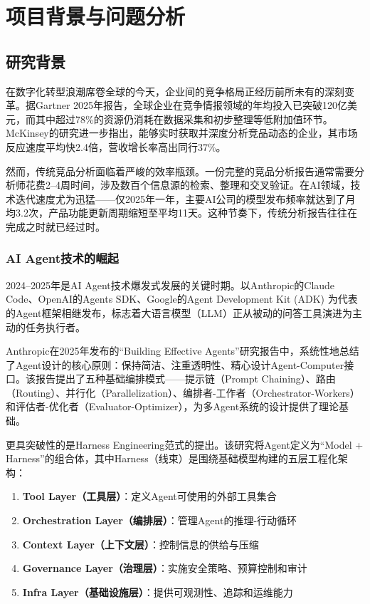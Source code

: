 \documentclass[12pt,a4paper]{ctexrep}
\begin{document}
\chapter{项目背景与问题分析}

\section{研究背景}

在数字化转型浪潮席卷全球的今天，企业间的竞争格局正经历前所未有的深刻变革。据Gartner 2025年报告，全球企业在竞争情报领域的年均投入已突破120亿美元，而其中超过78\%的资源仍消耗在数据采集和初步整理等低附加值环节。McKinsey的研究进一步指出，能够实时获取并深度分析竞品动态的企业，其市场反应速度平均快2.4倍，营收增长率高出同行37\%。

然而，传统竞品分析面临着严峻的效率瓶颈。一份完整的竞品分析报告通常需要分析师花费2--4周时间，涉及数百个信息源的检索、整理和交叉验证。在AI领域，技术迭代速度尤为迅猛——仅2025年一年，主要AI公司的模型发布频率就达到了月均3.2次，产品功能更新周期缩短至平均11天。这种节奏下，传统分析报告往往在完成之时就已经过时。

\subsection{AI Agent技术的崛起}

2024--2025年是AI Agent技术爆发式发展的关键时期。以Anthropic的Claude Code、OpenAI的Agents SDK、Google的Agent Development Kit (ADK) 为代表的Agent框架相继发布\cite{openaiagentssdk2025,googleadk2025}，标志着大语言模型（LLM）正从被动的问答工具演进为主动的任务执行者。

Anthropic在2025年发布的``Building Effective Agents''研究报告\cite{anthropic2025multiagent}中，系统性地总结了Agent设计的核心原则：保持简洁、注重透明性、精心设计Agent-Computer接口。该报告提出了五种基础编排模式——提示链（Prompt Chaining）、路由（Routing）、并行化（Parallelization）、编排者-工作者（Orchestrator-Workers）和评估者-优化者（Evaluator-Optimizer），为多Agent系统的设计提供了理论基础。

更具突破性的是Harness Engineering范式的提出\cite{harness2025}。该研究将Agent定义为``Model + Harness''的组合体，其中Harness（线束）是围绕基础模型构建的五层工程化架构：

\begin{enumerate}[leftmargin=2em]
\item \textbf{Tool Layer（工具层）}：定义Agent可使用的外部工具集合
\item \textbf{Orchestration Layer（编排层）}：管理Agent的推理-行动循环
\item \textbf{Context Layer（上下文层）}：控制信息的供给与压缩
\item \textbf{Governance Layer（治理层）}：实施安全策略、预算控制和审计
\item \textbf{Infra Layer（基础设施层）}：提供可观测性、追踪和运维能力
\end{enumerate}
\end{document}
